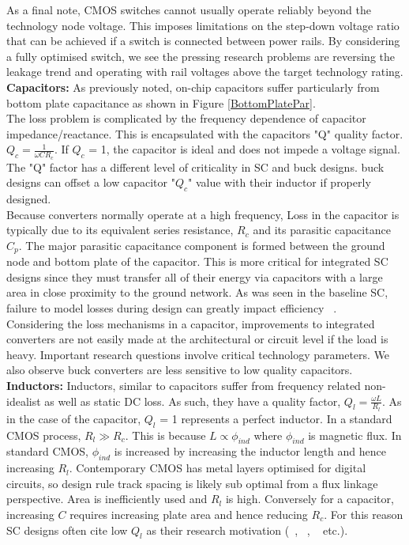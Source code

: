 \documentclass[letterpaper,twocolumn,10pt]{article}
\begin{document}
\indent As a final note, CMOS switches cannot usually operate reliably beyond the technology node voltage. This imposes limitations on the step-down voltage ratio that can be achieved if a switch is connected between power rails. %
\indent By considering a fully optimised switch, we see the pressing research problems are reversing the leakage trend\cite{Iwai2009} and operating with rail voltages above the target technology rating.\\ 
\textbf{Capacitors: }
As previously noted, on-chip capacitors suffer particularly from bottom plate capacitance as shown in Figure \ref{BottomPlatePar}.\\
The loss problem is complicated by the frequency dependence of capacitor impedance/reactance. This is encapsulated with the capacitors "Q" quality factor. $Q_c=\frac{1}{\omega CR_c}$. If $Q_c$ = 1, the capacitor is ideal and does not impede a voltage signal. The "Q" factor has a different level of criticality in SC and buck designs. buck designs can offset a low capacitor "$Q_c$" value with their inductor if properly designed.\\
Because converters normally operate at a high frequency, Loss in the capacitor is typically due to its equivalent series resistance, $R_c$ and its parasitic capacitance $C_p$. The major parasitic capacitance component is formed between the ground node and bottom plate of the capacitor\cite{Damak2013}. This is more critical for integrated SC designs since they must transfer all of their energy via capacitors with a large area in close proximity to the ground network. As was seen in the baseline SC, failure to model losses during design can greatly impact efficiency ~\cite{Viraj2007}.\\
\indent Considering the loss mechanisms in a capacitor, improvements to integrated converters are not easily made at the architectural or circuit level if the load is heavy. Important research questions involve critical technology parameters. We also observe buck converters are less sensitive to low quality capacitors.\\
\textbf{Inductors: }Inductors, similar to capacitors suffer from frequency related non-idealist as well as static DC loss. As such, they have a quality factor, $Q_l = \frac{\omega L}{R_l}$. As in the case of the capacitor, $Q_l$ = 1 represents a perfect inductor. In a standard CMOS process, $R_l \gg R_c$. This is because $L \propto \phi_{ind}$ where $\phi_{ind}$ is magnetic flux. In standard CMOS, $\phi_{ind}$ is increased by increasing the inductor length and hence increasing $R_l$. Contemporary CMOS has metal layers optimised for digital circuits, so design rule track spacing is likely sub optimal from a flux linkage perspective. Area is inefficiently used and $R_l$ is high. Conversely for a capacitor, increasing $C$ requires increasing plate area and hence reducing $R_c$. For this reason SC designs often cite low $Q_l$ as their research motivation (~\cite{Pique2012}, ~\cite{Yogesh2010}, ~\cite{PhuckLe2011} etc.).\\
\end{document}
